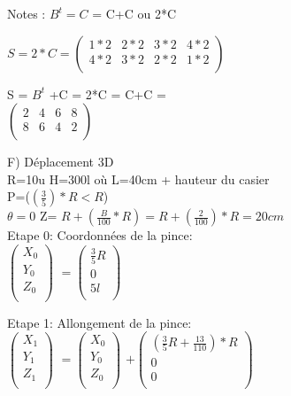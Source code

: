 Notes : $B^{t} = C$ = C+C ou 2*C
\vspace{5mm} %

$
S = 2*C =
\begin{pmatrix}
  1*2 & 2*2 & 3*2 & 4*2 \\
  4*2 & 3*2 & 2*2 & 1*2 \\
\end{pmatrix}
$

\vspace{5mm} %
S = $ B^{t}$ +C = 2*C = C+C = \\

$
\begin{pmatrix}
  2 & 4 & 6 & 8 \\
  8 & 6 & 4 & 2 \\
\end{pmatrix}
$

\vspace{10mm} %

F) Déplacement 3D \\

R=10u H=300l où L=40cm + hauteur du casier \\
P=($(\frac{3}{5})* R<R$) \\
$\theta =0$ Z= $R+(\frac{B}{100}*R) = R+(\frac{2}{100})*R=20cm $ \\

Etape 0: Coordonnées de la pince: \\

$
\begin{pmatrix}
  X_{0} \\
  Y_{0} \\
  Z_{0} \\
\end{pmatrix}
$
\vspace{5mm} %
$
=
\begin{pmatrix}
  \frac{3}{5}R \\
  0 \\
  5l \\
\end{pmatrix}
$

Etape 1: Allongement de la pince: \\

$
\begin{pmatrix}
  X_{1} \\
  Y_{1} \\
  Z_{1} \\
\end{pmatrix}
$
\vspace{5mm} %
$
=
\begin{pmatrix}
  X_{0} \\
  Y_{0} \\
  Z_{0} \\
\end{pmatrix}
$
\vspace{5mm} %
$
 +
\begin{pmatrix}
 (\frac{3}{5}R + \frac{13}{110})*R  \\
  0 \\
  0 \\
\end{pmatrix}
$

